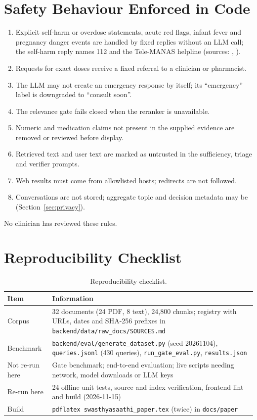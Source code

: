 \documentclass[10pt,a4paper]{article}
\newcommand{\code}[1]{\texttt{\small #1}}
\begin{document}
\section{Safety Behaviour Enforced in Code}
\begin{enumerate}[leftmargin=*]
  \item Explicit self-harm or overdose statements, acute red flags, infant fever and pregnancy danger events are handled by fixed replies without an LLM call; the self-harm reply names 112 and the Tele-MANAS helpline (sources: \citealt{erss}, \citealt{nmhp}).
  \item Requests for exact doses receive a fixed referral to a clinician or pharmacist.
  \item The LLM may not create an emergency response by itself; its ``emergency'' label is downgraded to ``consult soon''.
  \item The relevance gate fails closed when the reranker is unavailable.
  \item Numeric and medication claims not present in the supplied evidence are removed or reviewed before display.
  \item Retrieved text and user text are marked as untrusted in the sufficiency, triage and verifier prompts.
  \item Web results must come from allowlisted hosts; redirects are not followed.
  \item Conversations are not stored; aggregate topic and decision metadata may be (Section~\ref{sec:privacy}).
\end{enumerate}
No clinician has reviewed these rules.

\section{Reproducibility Checklist}
\begin{table}[h]
\centering\small
\caption{Reproducibility checklist.}
\begin{tabular}{p{3.6cm}p{11cm}}
\toprule
Item & Information\\
\midrule
Corpus & 32 documents (24 PDF, 8 text), 24,800 chunks; registry with URLs, dates and SHA-256 prefixes in \code{backend/data/raw\_docs/SOURCES.md} \citep{sources}\\
Benchmark & \code{backend/eval/generate\_dataset.py} (seed 20261104), \code{queries.jsonl} (430 queries), \code{run\_gate\_eval.py}, \code{results.json}\\
Not re-run here & Gate benchmark; end-to-end evaluation; live scripts needing network, model downloads or LLM keys\\
Re-run here & 24 offline unit tests, source and index verification, frontend lint and build (2026-11-15)\\
Build & \code{pdflatex swasthyasaathi\_paper.tex} (twice) in \code{docs/paper}\\
\bottomrule
\end{tabular}
\end{table}
\end{document}

